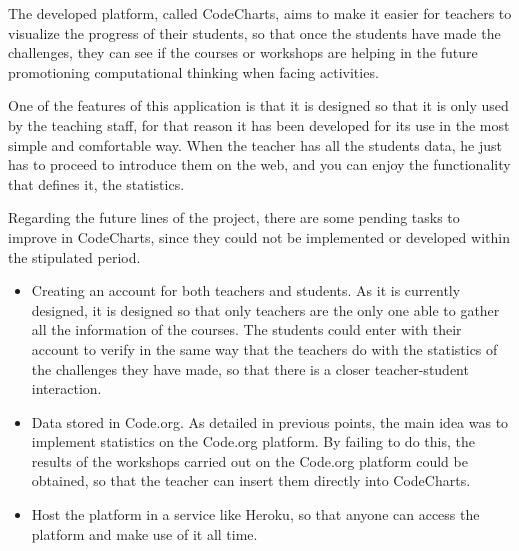 

The developed platform, called CodeCharts, aims to make it easier for teachers to visualize the progress of their students, so that once the students have made the challenges, they can see if the courses or workshops are helping in the future promotioning computational thinking when facing activities.

One of the features of this application is that it is designed so that it is only used by the teaching staff, for that reason it has been developed for its use in the most simple and comfortable way. When the teacher has all the students data, he just has to proceed to introduce them on the web, and you can enjoy the functionality that defines it, the statistics.

Regarding the future lines of the project, there are some pending tasks to improve in CodeCharts, since they could not be implemented or developed within the stipulated period.

\begin{itemize}
    \item Creating an account for both teachers and students. As it is currently designed, it is designed so that only teachers are the only one able to gather all the information of the courses. The students could enter with their account to verify in the same way that the teachers do with the statistics of the challenges they have made, so that there is a closer teacher-student interaction.
    \item Data stored in Code.org. As detailed in previous points, the main idea was to implement statistics on the Code.org platform. By failing to do this, the results of the workshops carried out on the Code.org platform could be obtained, so that the teacher can insert them directly into CodeCharts.
    \item Host the platform in a service like Heroku, so that anyone can access the platform and make use of it all time.
\end{itemize}

